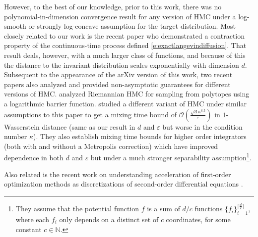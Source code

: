 However, to the best of our knowledge, prior to this work, there was no polynomial-in-dimension convergence result for any version of HMC under a log-smooth or strongly log-concave assumption for the target distribution. Most closely related to our work is the recent paper \citet{eberle2017couplings} who demonstrated a contraction property of the continuous-time process defined \eqref{e:exactlangevindiffusion}. That result deals, however, with a much larger class of functions, and because of this the distance to the invariant distribution scales exponentially with dimension $d$. Subsequent to the appearance of the arXiv version of this work, two recent papers also analyzed and provided non-asymptotic guarantees for different versions of HMC. \citet{lee2017convergence} analyzed Riemannian HMC for sampling from polytopes using a logarithmic barrier function. \citet{mangoubi2017rapid} studied a different variant of HMC under similar assumptions to this paper to get a mixing time bound of $\mathcal{O}(\frac{\sqrt{d}\kappa^{6.5}}{\varepsilon})$ in $1$-Wasserstein distance (same as our result in $d$ and $\varepsilon$ but worse in the condition number $\kappa$). They also establish mixing time bounds for higher order integrators (both with and without a Metropolis correction) which have improved dependence in both $d$ and $\varepsilon$ but under a much stronger separability assumption\footnote{They assume that the potential function $f$ is a sum of $d/c$ functions $\{f_i\}_{i=1}^{\lceil\frac{d}{c}\rceil}$, where each $f_i$ only depends on a distinct set of $c$ coordinates, for some constant $c \in \mathbb{N}$.}.

Also related is the recent work on understanding acceleration of first-order optimization methods as discretizations of second-order differential equations \citep{su2014differential,krichene2015accelerated, wibisono2016variational}.
